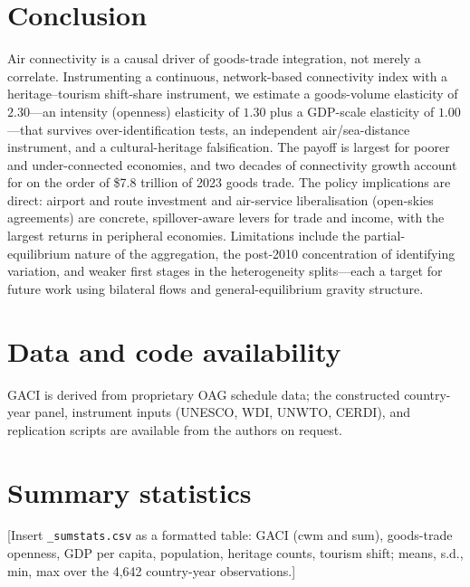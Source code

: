 \documentclass[review,3p,times]{elsarticle}
\begin{document}
\section{Conclusion}
Air connectivity is a causal driver of goods-trade integration, not merely a
correlate. Instrumenting a continuous, network-based connectivity index with a
heritage--tourism shift-share instrument, we estimate a goods-volume elasticity
of $2.30$---an intensity (openness) elasticity of $1.30$ plus a GDP-scale
elasticity of $1.00$---that survives over-identification tests, an independent
air/sea-distance instrument, and a cultural-heritage falsification. The payoff
is largest for poorer and under-connected economies, and two decades of
connectivity growth account for on the order of \$7.8 trillion of 2023 goods
trade. The policy implications are direct: airport and route investment and
air-service liberalisation (open-skies agreements) are concrete,
spillover-aware levers for trade and income, with the largest returns in
peripheral economies. Limitations include the partial-equilibrium nature of the
aggregation, the post-2010 concentration of identifying variation, and weaker
first stages in the heterogeneity splits---each a target for future work using
bilateral flows and general-equilibrium gravity structure.

\section*{Data and code availability}
GACI is derived from proprietary OAG schedule data; the constructed
country-year panel, instrument inputs (UNESCO, WDI, UNWTO, CERDI), and
replication scripts are available from the authors on request.

\appendix
\section{Summary statistics}\label{app:sumstat}
[Insert \texttt{\_sumstats.csv} as a formatted table: GACI (cwm and sum),
goods-trade openness, GDP per capita, population, heritage counts, tourism
shift; means, s.d., min, max over the 4{,}642 country-year observations.]



\end{document}
